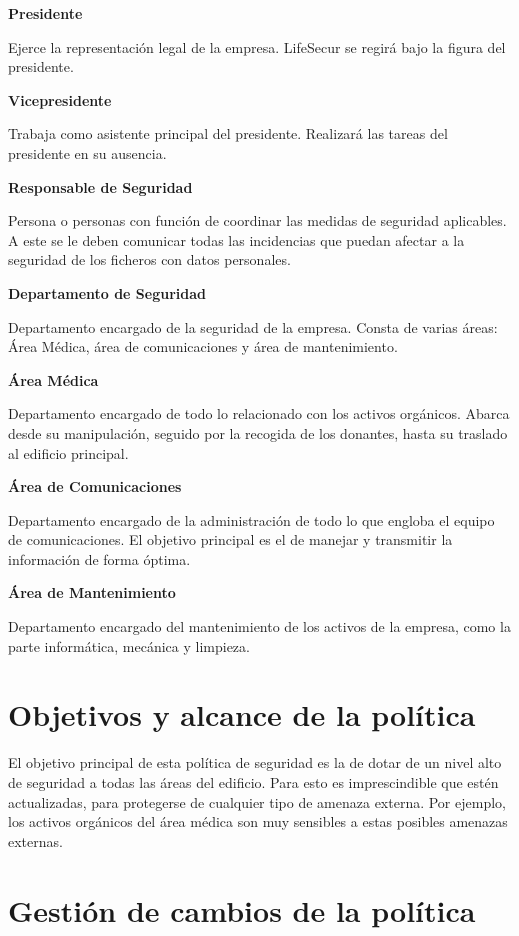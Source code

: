 \documentclass[11pt,bibtotoc,noliststotoc,BCOR0mm]{scrbook}
\begin{document}
\newpage

\textbf{Presidente}

Ejerce la representación legal de la empresa. LifeSecur se regirá bajo la figura del presidente.

\textbf{Vicepresidente}

Trabaja como asistente principal del presidente. Realizará las tareas del presidente en su ausencia.

\textbf{Responsable de Seguridad}

Persona o personas con función de coordinar las medidas de seguridad aplicables. A este se le deben comunicar todas las incidencias que puedan afectar a la seguridad de los ficheros con datos personales.

\textbf{Departamento de Seguridad}

Departamento encargado de la seguridad de la empresa. Consta de varias áreas: Área Médica, área de comunicaciones y área de mantenimiento.

\textbf{Área Médica}

Departamento encargado de todo lo relacionado con los activos orgánicos. Abarca desde su manipulación, seguido por la recogida de los donantes, hasta su traslado al edificio principal.

\textbf{Área de Comunicaciones}

Departamento encargado de la administración de todo lo que engloba el equipo de comunicaciones. El objetivo principal es el de manejar y transmitir la información de forma óptima.

\textbf{Área de Mantenimiento}

Departamento encargado del mantenimiento de los activos de la empresa, como la parte informática, mecánica y limpieza.

\section{Objetivos y alcance de la política}

El objetivo principal de esta política de seguridad es la de dotar de un nivel alto de seguridad a todas las áreas del edificio. Para esto es imprescindible que estén actualizadas, para protegerse de cualquier tipo de amenaza externa. Por ejemplo, los activos orgánicos del área médica son muy sensibles a estas posibles amenazas externas.

\section{Gestión de cambios de la política}
\end{document}
